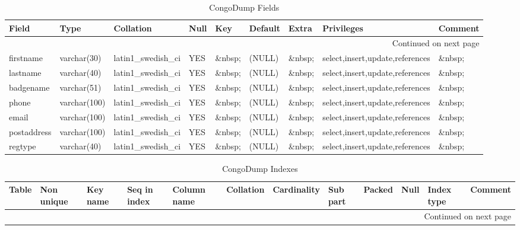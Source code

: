 \documentclass[tablesignature]{scrartcl}
\begin{document}
\begin{longtable}{|l|l|l|l|l|l|l|l|l|}
\caption{CongoDump Fields} \label{tbl:congodumpfields}\\
\hline
 Field        &  Type          &  Collation                &  Null     &  Key      &  Default  &  Extra    &  Privileges                       &  Comment \\
\hline
\endhead
\hline\multicolumn{9}{r}{Continued on next page}\
\endfoot
\endlastfoot
\hline
 badgeid      &  varchar(15)   &  latin1\_{}swedish\_{}ci  &  \&nbsp;  &  PRI      &  \&nbsp;  &  \&nbsp;  &  select,insert,update,references  &  \&nbsp;  \\
 firstname    &  varchar(30)   &  latin1\_{}swedish\_{}ci  &  YES      &  \&nbsp;  &  (NULL)   &  \&nbsp;  &  select,insert,update,references  &  \&nbsp;  \\
 lastname     &  varchar(40)   &  latin1\_{}swedish\_{}ci  &  YES      &  \&nbsp;  &  (NULL)   &  \&nbsp;  &  select,insert,update,references  &  \&nbsp;  \\
 badgename    &  varchar(51)   &  latin1\_{}swedish\_{}ci  &  YES      &  \&nbsp;  &  (NULL)   &  \&nbsp;  &  select,insert,update,references  &  \&nbsp;  \\
 phone        &  varchar(100)  &  latin1\_{}swedish\_{}ci  &  YES      &  \&nbsp;  &  (NULL)   &  \&nbsp;  &  select,insert,update,references  &  \&nbsp;  \\
 email        &  varchar(100)  &  latin1\_{}swedish\_{}ci  &  YES      &  \&nbsp;  &  (NULL)   &  \&nbsp;  &  select,insert,update,references  &  \&nbsp;  \\
 postaddress  &  varchar(100)  &  latin1\_{}swedish\_{}ci  &  YES      &  \&nbsp;  &  (NULL)   &  \&nbsp;  &  select,insert,update,references  &  \&nbsp;  \\
 regtype      &  varchar(40)   &  latin1\_{}swedish\_{}ci  &  YES      &  \&nbsp;  &  (NULL)   &  \&nbsp;  &  select,insert,update,references  &  \&nbsp;  \\
\hline
\end{longtable}


\begin{longtable}{|l|l|l|l|l|l|l|l|l|l|l|l|}
\caption{CongoDump Indexes} \label{tbl:congodumpindexes}\\
\hline
 Table      &  Non unique  &  Key name  &  Seq in index  &  Column name  &  Collation  &  Cardinality  &  Sub part  &  Packed  &  Null     &  Index type  &  Comment \\
\hline
\endhead
\hline\multicolumn{12}{r}{Continued on next page}\
\endfoot
\endlastfoot
\hline
 CongoDump  &           0  &  PRIMARY   &             1  &  badgeid      &  A          &            2  &  (NULL)    &  (NULL)  &  \&nbsp;  &  BTREE       &  \&nbsp;  \\
\hline
\end{longtable}
\end{document}
